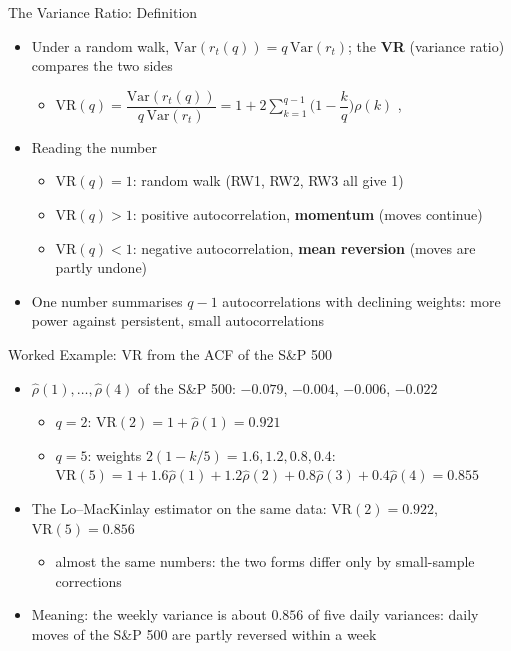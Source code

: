 \begin{frame}{The Variance Ratio: Definition}
\itemsize{\small}
\begin{itemize}
    \item Under a random walk, $\mathrm{Var}(r_t(q)) = q\,\mathrm{Var}(r_t)$; the \textbf{VR} (variance ratio) compares the two sides
    \begin{itemize}
        \item $\mathrm{VR}(q) = \dfrac{\mathrm{Var}(r_t(q))}{q\,\mathrm{Var}(r_t)} = 1 + 2\sum_{k=1}^{q-1}\Big(1 - \dfrac{k}{q}\Big)\rho(k)$ , 
    \end{itemize}
    \item Reading the number
    \begin{itemize}
        \item $\mathrm{VR}(q) = 1$: random walk (RW1, RW2, RW3 all give 1)
        \item $\mathrm{VR}(q) > 1$: positive autocorrelation, \textbf{momentum} (moves continue)
        \item $\mathrm{VR}(q) < 1$: negative autocorrelation, \textbf{mean reversion} (moves are partly undone)
    \end{itemize}
    \item One number summarises $q - 1$ autocorrelations with declining weights: more power against persistent, small autocorrelations
\end{itemize}
\end{frame}

\begin{frame}{Worked Example: VR from the ACF of the S\&P 500}
\itemsize{\small}
\begin{itemize}
    \item $\hat\rho(1), \dots, \hat\rho(4)$ of the S\&P 500: $-0.079$, $-0.004$, $-0.006$, $-0.022$
    \begin{itemize}
        \item $q = 2$: $\mathrm{VR}(2) = 1 + \hat\rho(1) = 0.921$
        \item $q = 5$: weights $2(1 - k/5) = 1.6, 1.2, 0.8, 0.4$: $\mathrm{VR}(5) = 1 + 1.6\hat\rho(1) + 1.2\hat\rho(2) + 0.8\hat\rho(3) + 0.4\hat\rho(4) = 0.855$
    \end{itemize}
    \item The Lo--MacKinlay estimator on the same data: $\mathrm{VR}(2) = 0.922$, $\mathrm{VR}(5) = 0.856$
    \begin{itemize}
        \item almost the same numbers: the two forms differ only by small-sample corrections
    \end{itemize}
    \item Meaning: the weekly variance is about $0.856$ of five daily variances: daily moves of the S\&P 500 are partly reversed within a week
\end{itemize}
\end{frame}

